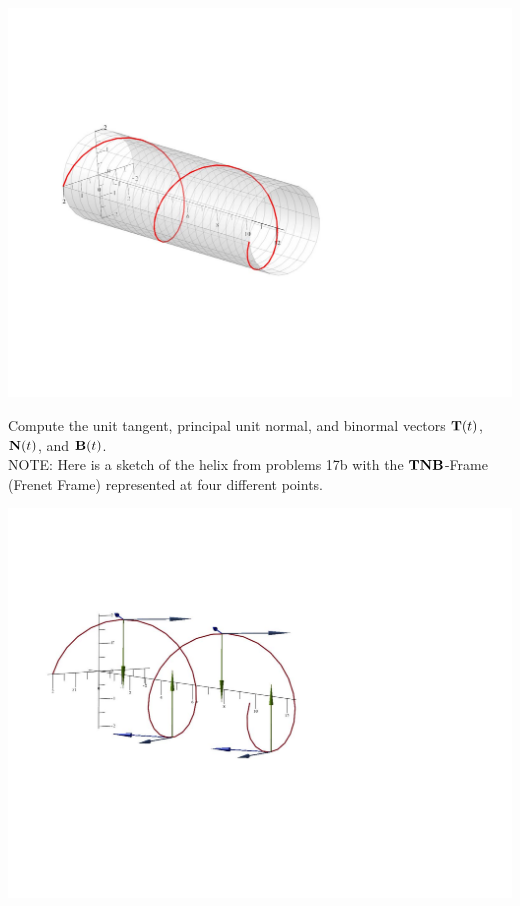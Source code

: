 \documentclass[12pt]{article}
\begin{document}
\begin{enumerate}
\begin{enumerate}
\begin{center}
\includegraphics[scale=0.5]{helix.pdf}
\end{center}

Compute the unit tangent, principal unit normal, and binormal vectors ${\bf T}(t)$, ${\bf N}(t)$, and ${\bf B}(t)$.\\

NOTE: Here is a sketch of the helix from problems 17b with the ${\bf TNB}$-Frame (Frenet Frame) represented at four different points.
\begin{center}
\includegraphics[scale=0.5]{frenet.pdf}
\end{center}


\end{enumerate}
\end{enumerate}
\end{document}
